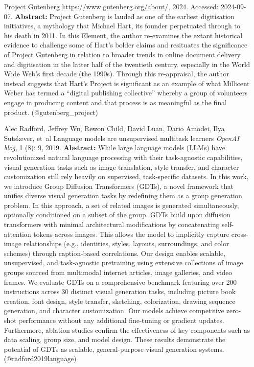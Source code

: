 \documentclass{article} %
\begin{document}
\begin{thebibliography}{}
 {Project Gutenberg}  \newblock \url{https://www.gutenberg.org/about/}, 2024. \newblock Accessed: 2024-09-07. \newblock \textbf{Abstract:} Project Gutenberg is lauded as one of the earliest digitisation initiatives, a mythology that Michael Hart, its founder perpetuated through to his death in 2011. In this Element, the author re-examines the extant historical evidence to challenge some of Hart's bolder claims and resituates the significance of Project Gutenberg in relation to broader trends in online document delivery and digitisation in the latter half of the twentieth century, especially in the World Wide Web's first decade (the 1990s). Through this re-appraisal, the author instead suggests that Hart's Project is significant as an example of what Millicent Weber has termed a “digital publishing collective” whereby a group of volunteers engage in producing content and that process is as meaningful as the final product. \newblock (@gutenberg\_project)

 Alec Radford, Jeffrey Wu, Rewon Child, David Luan, Dario Amodei, Ilya Sutskever, et~al \newblock Language models are unsupervised multitask learners \newblock \emph{OpenAI blog}, 1 (8): 9, 2019. \newblock \textbf{Abstract:} While large language models (LLMs) have revolutionized natural language processing with their task-agnostic capabilities, visual generation tasks such as image translation, style transfer, and character customization still rely heavily on supervised, task-specific datasets. In this work, we introduce Group Diffusion Transformers (GDTs), a novel framework that unifies diverse visual generation tasks by redefining them as a group generation problem. In this approach, a set of related images is generated simultaneously, optionally conditioned on a subset of the group. GDTs build upon diffusion transformers with minimal architectural modifications by concatenating self-attention tokens across images. This allows the model to implicitly capture cross-image relationships (e.g., identities, styles, layouts, surroundings, and color schemes) through caption-based correlations. Our design enables scalable, unsupervised, and task-agnostic pretraining using extensive collections of image groups sourced from multimodal internet articles, image galleries, and video frames. We evaluate GDTs on a comprehensive benchmark featuring over 200 instructions across 30 distinct visual generation tasks, including picture book creation, font design, style transfer, sketching, colorization, drawing sequence generation, and character customization. Our models achieve competitive zero-shot performance without any additional fine-tuning or gradient updates. Furthermore, ablation studies confirm the effectiveness of key components such as data scaling, group size, and model design. These results demonstrate the potential of GDTs as scalable, general-purpose visual generation systems. \newblock (@radford2019language)


\end{thebibliography}
\end{document}
